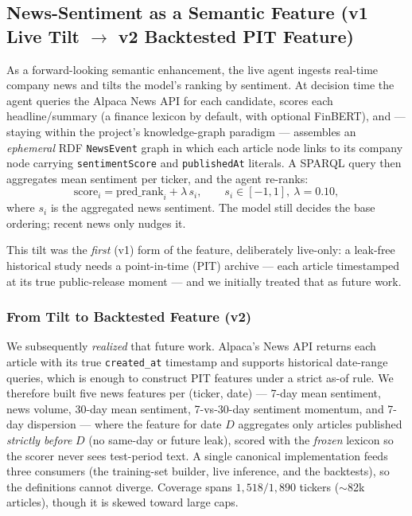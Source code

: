 \documentclass[10pt,journal,compsoc]{IEEEtran}
\begin{document}
\subsection{News-Sentiment as a Semantic Feature (v1 Live Tilt $\to$ v2 Backtested PIT Feature)}
As a forward-looking semantic enhancement, the live agent ingests real-time company news and tilts the model's ranking by sentiment. At decision time the agent queries the Alpaca News API for each candidate, scores each headline/summary (a finance lexicon by default, with optional FinBERT), and --- staying within the project's knowledge-graph paradigm --- assembles an \emph{ephemeral} RDF \texttt{NewsEvent} graph in which each article node links to its company node carrying \texttt{sentimentScore} and \texttt{publishedAt} literals. A SPARQL query then aggregates mean sentiment per ticker, and the agent re-ranks:
\begin{equation}
\text{score}_i = \text{pred\_rank}_i + \lambda\, s_i, \qquad s_i \in [-1, 1],\ \lambda = 0.10,
\end{equation}
where $s_i$ is the aggregated news sentiment. The model still decides the base ordering; recent news only nudges it.

This tilt was the \emph{first} (v1) form of the feature, deliberately live-only: a leak-free historical study needs a point-in-time (PIT) archive --- each article timestamped at its true public-release moment --- and we initially treated that as future work.

\subsubsection{From Tilt to Backtested Feature (v2)}
We subsequently \emph{realized} that future work. Alpaca's News API returns each article with its true \texttt{created\_at} timestamp and supports historical date-range queries, which is enough to construct PIT features under a strict as-of rule. We therefore built five news features per (ticker, date) --- 7-day mean sentiment, news volume, 30-day mean sentiment, 7-vs-30-day sentiment momentum, and 7-day dispersion --- where the feature for date $D$ aggregates only articles published \emph{strictly before} $D$ (no same-day or future leak), scored with the \emph{frozen} lexicon so the scorer never sees test-period text. A single canonical implementation feeds three consumers (the training-set builder, live inference, and the backtests), so the definitions cannot diverge. Coverage spans $1{,}518/1{,}890$ tickers ($\sim$82k articles), though it is skewed toward large caps.
\end{document}
